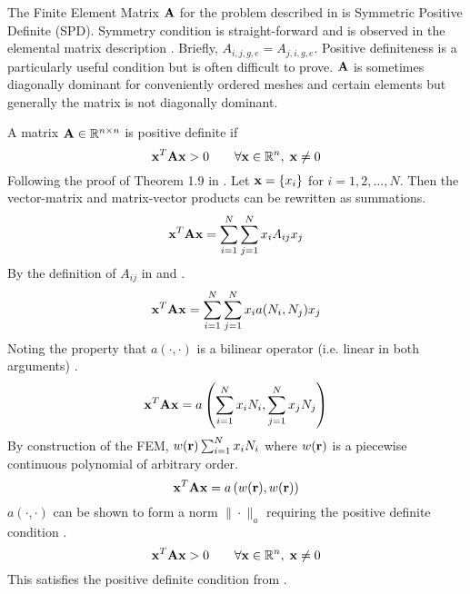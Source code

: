     The Finite Element Matrix $\mathbf{A}$ for the problem described in 
     is Symmetric Positive Definite (SPD). Symmetry
    condition is straight-forward and is observed in the elemental matrix 
    description . Briefly, $A_{i,j,g,e}=A_{j,i,g,e}$.
    Positive definiteness is a particularly useful condition but is often 
    difficult to prove. $\mathbf{A}$ is sometimes diagonally dominant for conveniently
    ordered meshes and certain elements but generally the matrix is not 
    diagonally dominant. 
    
    A matrix $\mathbf{A} \in \mathbb{R}^{n \times n}$ is positive definite if
    \begin{equation} \label{eq:positive_definite}
      \mathbf{x}^{T} \mathbf{A} \mathbf{x} > 0 \qquad \forall \mathbf{x} \in \mathbb{R}^{n}, \; \mathbf{x} \ne 0
    \end{equation}
    Following the proof of Theorem 1.9 in \cite{textbookhughes}. Let 
    $\mathbf{x} = \{x_i\}$ for $i = 1,2,\ldots,N$. Then the vector-matrix and 
    matrix-vector products can be rewritten as summations.
    \begin{equation}
      \mathbf{x}^{T} \mathbf{A} \mathbf{x} = \sum_{i=1}^{N} \sum_{j=1}^{N} x_i A_{ij} x_j
    \end{equation}
    By the definition of $A_{ij}$ in  and 
    .
    \begin{equation}
      \mathbf{x}^{T} \mathbf{A} \mathbf{x} = 
        \sum_{i=1}^{N} \sum_{j=1}^{N} x_i a(N_i,N_j) x_j
    \end{equation}
    Noting the property that $a(\cdot,\cdot)$ is a bilinear operator (i.e.
    linear in both arguments) \cite{textbookli}.
    \begin{equation}
      \mathbf{x}^{T} \mathbf{A} \mathbf{x} =
        a \left( \sum_{i=1}^{N} x_i N_i, \sum_{j=1}^{N} x_j N_j 
        \right)
    \end{equation}
    By construction of the FEM, $w(\mathbf{r}) \sum_{i=1}^{N} x_i N_i$ where 
    $w(\mathbf{r})$ is a piecewise continuous polynomial of arbitrary order.
    \begin{equation}
      \mathbf{x}^{T} \mathbf{A} \mathbf{x} = a \left(w(\mathbf{r}),w(\mathbf{r})\right)
    \end{equation}
    $a(\cdot,\cdot)$ can be shown to form a norm $\|\cdot \|_a$ requiring the 
    positive definite condition \cite{textbookli}.
    \begin{equation}
      \mathbf{x}^{T} \mathbf{A} \mathbf{x} > 0 \qquad \forall \mathbf{x} \in \mathbb{R}^{n}, \; \mathbf{x} \ne 0
    \end{equation}
    This satisfies the positive definite condition from 
    .
    
